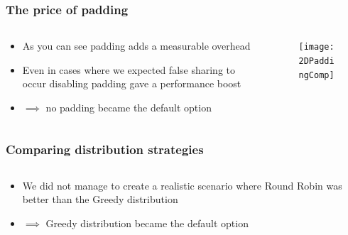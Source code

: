 \begin{frame}
	\frametitle{The price of padding}
	\vspace{0.8cm}
	\begin{columns}
		\begin{column}{0.4\linewidth}
			\large
			\begin{itemize}
				\setlength\itemsep{1em}
				\item As you can see padding adds a measurable overhead
				\item Even in cases where we expected false sharing to occur disabling padding gave a performance boost
				\item $\implies$ no padding became the default option
			\end{itemize}
			
		\end{column}
		\begin{column}{0.6\linewidth}
			\vspace{-1.6cm}
				\begin{figure}
				\centering
				\texttt{[image: 2DPaddingComp]}
				\label{fig:2dpaddingcomp}
			\end{figure}
		\end{column}
	\end{columns}
\end{frame}

\begin{frame}
	\frametitle{Comparing distribution strategies}
	\begin{columns}
		\begin{column}{0.4\linewidth}
			\large
			\begin{itemize}
				\setlength\itemsep{1em}
				\item We did not manage to create a realistic scenario where Round Robin was better than the Greedy distribution
				\item $\implies$ Greedy distribution became the default option
			\end{itemize}
			
		\end{column}
		\begin{column}{0.6\linewidth}
			
		\end{column}
	\end{columns}
\end{frame}


